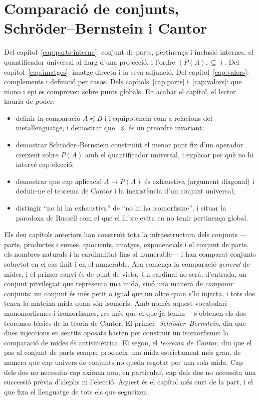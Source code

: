 \chapter[Schröder--Bernstein i Cantor]{Comparació de conjunts,\texorpdfstring{\\}{ }Schröder--Bernstein i Cantor}\label{cap:cantor}

\begin{objectius}
 Del capítol~\ref{cap:parts-interna}: conjunt de parts, pertinença i inclusió internes, el quantificador universal al llarg d'una projecció, i l'ordre \((P(A),\subseteq)\). Del capítol~\ref{cap:imatges}: imatge directa i la seva adjunció. Del capítol~\ref{cap:valors}: complements i definició per casos. Dels capítols~\ref{cap:parts} i~\ref{cap:valors}: que mono i epi es comproven sobre punts globals.
 En acabar el capítol, el lector hauria de poder:
\begin{itemize}
  \item definir la comparació \(A\preceq B\) i l'equipotència com a relacions del metallenguatge, i demostrar que \(\preceq\) és un preordre invariant;
  \item demostrar Schröder--Bernstein construint el menor punt fix d'un operador creixent sobre \(P(A)\) amb el quantificador universal, i explicar per què no hi intervé cap elecció;
  \item demostrar que cap aplicació \(A\to P(A)\) és exhaustiva (argument diagonal) i deduir-ne el teorema de Cantor i la inexistència d'un conjunt universal;
  \item distingir \enquote{no hi ha exhaustiva} de \enquote{no hi ha isomorfisme}, i situar la paradoxa de Russell com el que el llibre evita en no tenir pertinença global.
\end{itemize}
\end{objectius}

Els deu capítols anteriors han construït tota la infraestructura dels
conjunts ---parts, productes i sumes, quocients, imatges, exponencials i
el conjunt de parts, els nombres naturals i la cardinalitat fins al
numerable--- i han comparat conjunts sobretot en el cas finit i en el
numerable. Ara comença la comparació \emph{general} de mides, i el primer
canvi és de punt de vista. Un cardinal no serà, d'entrada, un conjunt
privilegiat que representa una mida, sinó una manera de \emph{comparar}
conjunts: un conjunt és més petit o igual que un altre quan s'hi injecta, i
tots dos tenen la mateixa mida quan són isomorfs. Amb només aquest
vocabulari ---monomorfismes i isomorfismes, res més que el que ja tenim---
s'obtenen els dos teoremes bàsics de la teoria de Cantor. El primer,
\emph{Schröder--Bernstein}, diu que dues injeccions en sentits oposats
basten per construir un isomorfisme: la comparació de mides és
antisimètrica. El segon, el \emph{teorema de Cantor}, diu que el pas al
conjunt de parts sempre produeix una mida estrictament més gran, de manera
que cap univers de conjunts no queda esgotat per una sola mida. Cap dels
dos no necessita cap axioma nou; en particular, cap dels dos no necessita
una successió prèvia d'alephs ni l'elecció. Aquest és el capítol més curt de
la part, i el que fixa el llenguatge de tots els que segueixen.

